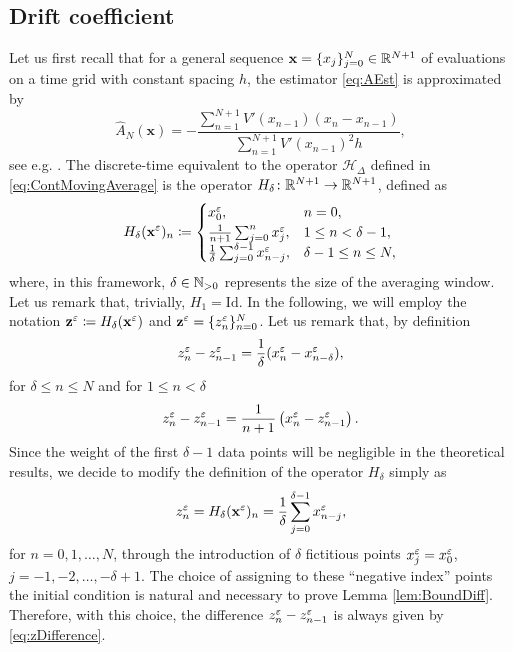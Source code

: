 \documentclass[10pt]{article}
\begin{document}
\subsection{Drift coefficient}
Let us first recall that for a general sequence $\mathbf x = \{x_j\}_{j=0}^N \in \mathbb{R}^{N+1}$ of evaluations on a time grid with constant spacing $h$, the estimator \eqref{eq:AEst} is approximated by
\begin{equation}\label{eq:AEstDiscrete}
	\widehat A_N(\mathbf x) = -\frac{\sum_{n=1}^{N+1} V'(x_{n-1})(x_n - x_{n-1})}{\sum_{n=1}^{N+1}V'(x_{n-1})^2 h},
\end{equation}
see e.g. \cite{PaS07}. The discrete-time equivalent to the operator $\mathcal H_\Delta$ defined in \eqref{eq:ContMovingAverage} is the operator $H_\delta\colon \mathbb{R}^{N+1} \to \mathbb{R}^{N+1}$, defined as
\begin{equation}
	H_\delta (\mathbf x^\varepsilon)_n \coloneqq 
	\begin{cases}
		x^\varepsilon_0, &n = 0,\\
		\frac1{n+1} \sum_{j=0}^n x^\varepsilon_j, &1 \leq n < \delta-1,\\
		\frac1\delta \sum_{j=0}^{\delta-1} x^\varepsilon_{n-j}, &\delta - 1 \leq n \leq N,
	\end{cases} 
\end{equation}
where, in this framework, $\delta \in \mathbb{N}_{>0}$ represents the size of the averaging window. Let us remark that, trivially, $H_1 = \mathrm{Id}$. In the following, we will employ the notation $\mathbf z^\varepsilon \coloneqq H_\delta(\mathbf x^\varepsilon)$ and $\mathbf z^\varepsilon=\{z^\varepsilon_n\}_{n=0}^{N}$. Let us remark that, by definition
\begin{equation}\label{eq:zDifference}
	z^\varepsilon_n - z^\varepsilon_{n-1} = \frac1\delta(x^\varepsilon_n - x^\varepsilon_{n-\delta}),
\end{equation}
for $\delta  \leq n \leq N$ and for $1 \leq n < \delta$
\begin{equation}
	z^\varepsilon_n - z^\varepsilon_{n-1} = \frac1{n+1} \left(x_n^\varepsilon - z^\varepsilon_{n-1}\right).
\end{equation}
Since the weight of the first $\delta-1$ data points will be negligible in the theoretical results, we decide to modify the definition of the operator $H_\delta$ simply as
\begin{equation}
	z^\varepsilon_n = H_\delta (\mathbf x^\varepsilon)_n = \frac1\delta \sum_{j=0}^{\delta-1} x^\varepsilon_{n-j},
\end{equation}
for $n = 0, 1, \ldots, N$, through the introduction of $\delta$ fictitious points $x^\varepsilon_j = x^\varepsilon_0$, $j = -1, -2, \ldots, -\delta+1$. The choice of assigning to these ``negative index'' points the initial condition is natural and necessary to prove Lemma \ref{lem:BoundDiff}. Therefore, with this choice, the difference $z_n^\varepsilon - z_{n-1}^\varepsilon$ is always given by \eqref{eq:zDifference}.
\end{document}
